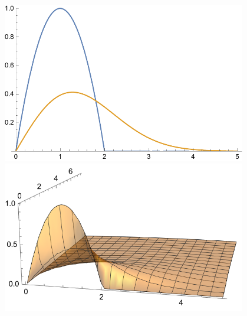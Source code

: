 \documentclass[10pt]{article}
\begin{document}
\begin{center}
    \includegraphics[width=0.8\textwidth]{img/4_1.pdf}
    \vspace{7.5mm}
    \includegraphics[width=0.8\textwidth]{img/4_2.pdf}
\end{center}

\newpage
\end{document}
